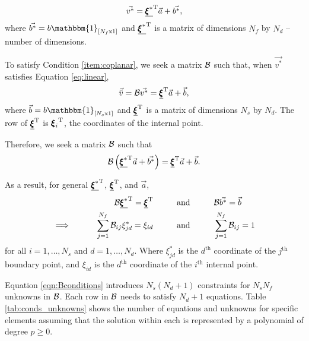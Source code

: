 \begin{equation}
\label{eq:linear}
\vec{v^*} = \underline{{\pmb \xi}^*}^\mathrm{T}\vec{a} + \vec{b^*},
\end{equation}
where $\vec{b^*} = b\mathbbm{1}_{[N_f \mathrm{x} 1]}$ and $\underline{{\pmb \xi}^*}^\mathrm{T}$ is a matrix of dimensions $N_f$ by $N_d$ --number of dimensions.

To satisfy Condition \ref{item:coplanar}, we seek a matrix $\mathcal{B}$ such that, when $\vec{v^*}$ satisfies Equation \ref{eq:linear},
\begin{equation}
\vec{\bar{v}} = \mathcal{B}\vec{v^*} = \underline{{\pmb \xi}}^\mathrm{T} \vec{a} + \vec{b},
\end{equation}
where $\vec{b} = b\mathbbm{1}_{[N_s \mathrm{x} 1]}$ and $\underline{{\pmb \xi}}^\mathrm{T}$ is a matrix of dimensions $N_s$ by $N_d$. The \ith row of $\underline{{\pmb \xi}}^\mathrm{T}$ is ${{\pmb \xi}_i}^\mathrm{T}$, the coordinates of the \ith internal point.

Therefore, we seek a matrix $\mathcal{B}$ such that
\begin{equation}
\mathcal{B}\left(\underline{{\pmb \xi}^*}^\mathrm{T}\vec{a} + \vec{b^*}\right) = \underline{{\pmb \xi}}^\mathrm{T} \vec{a} + \vec{b}.
\end{equation}

As a result, for general $ \underline{{\pmb \xi}^*}^\mathrm{T}$, $\underline{{\pmb \xi}}^\mathrm{T} $, and $\vec{a}$,
\begin{align}
\mathcal{B}\underline{{\pmb \xi}^*}^\mathrm{T} = \underline{{\pmb \xi}}^\mathrm{T}  \hspace{1cm} &\text{and} \hspace{1cm} \mathcal{B}\vec{b^*} = \vec{b}\\
\label{eqn:Bconditions}\implies \hspace{1cm} \sum_{j=1}^{N_f}\mathcal{B}_{ij}\xi^*_{jd} = \xi_{id} \hspace{1cm} &\text{and} \hspace{1cm} \sum_{j = 1}^{N_f} \mathcal{B}_{ij} = 1
\end{align}
for all $i = 1,\dots,N_s$ and $d = 1,\dots,N_d$. Where $\xi^*_{jd}$ is the $d^\text{th}$ coordinate of the $j^\text{th}$ boundary point, and $\xi_{id}$ is the $d^\text{th}$ coordinate of the $i^\text{th}$ internal point.

Equation \ref{eqn:Bconditions} introduces $N_s (N_d + 1)$ constraints for $N_sN_f$ unknowns in $\mathcal{B}$. Each row in $\mathcal{B}$ needs to satisfy $N_d+1$ equations. Table \ref{tab:conds_unknowns} shows the number of equations and unknowns for specific elements assuming that the solution within each is represented by a polynomial of degree $p\ge0$.

